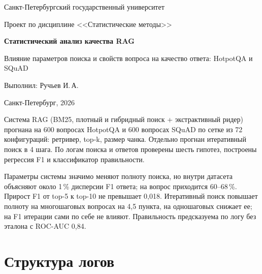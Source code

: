 



\begin{titlepage}
\centering
{\large Санкт-Петербургский государственный университет\par}
\vspace{3cm}
{\large Проект по дисциплине <<Статистические методы>>\par}
\vspace{3cm}
{\LARGE\bfseries Статистический анализ качества RAG\par}
\vspace{0.8cm}
{\large Влияние параметров поиска и свойств вопроса на качество ответа: HotpotQA и SQuAD\par}
\vspace{4cm}
\begin{flushright}
Выполнил: Ручьев И.\,А.\par
\end{flushright}
\vfill
{Санкт-Петербург, 2026\par}
\end{titlepage}

\begin{tcolorbox}[colback=boxbg,colframe=accent,boxrule=0.6pt,arc=0pt,left=8pt,right=8pt,top=6pt,bottom=6pt]
\small
Система RAG (BM25, плотный и гибридный поиск + экстрактивный ридер) прогнана на 600 вопросах HotpotQA и 600 вопросах SQuAD по сетке из 72 конфигураций: ретривер, top-k, размер чанка. Отдельно прогнан итеративный поиск в 4 шага. По логам поиска и ответов проверены шесть гипотез, построены регрессия F1 и классификатор правильности.

Параметры системы значимо меняют полноту поиска, но внутри датасета объясняют около 1\,\% дисперсии F1 ответа; на вопрос приходится 60--68\,\%. Прирост F1 от top-5 к top-10 не превышает 0,018. Итеративный поиск повышает полноту на многошаговых вопросах на 4,5 пункта, на одношаговых снижает ее; на F1 итерации сами по себе не влияют. Правильность предсказуема по логу без эталона с ROC-AUC 0,84.
\end{tcolorbox}

\tableofcontents
\newpage






\appendix
\renewcommand{\thesection}{\Asbuk{section}}
\section{Структура логов}\label{app:logs}
\begingroup\raggedright


